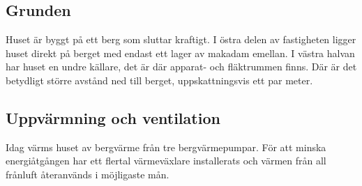 \subsection{Grunden}

Huset är byggt på ett berg som sluttar kraftigt. I östra delen av fastigheten ligger huset direkt på berget med endast ett lager av makadam emellan\cite{petersarneo}. I västra halvan har huset en undre källare, det är där apparat- och fläktrummen finns. Där är det betydligt större avstånd ned till berget, uppskattningsvis ett par meter. %

\subsection{Uppvärmning och ventilation}
Idag värms huset av bergvärme från tre bergvärmepumpar. För att minska energiåtgången har ett flertal värmeväxlare installerats och värmen från all frånluft återanvänds i möjligaste mån.
